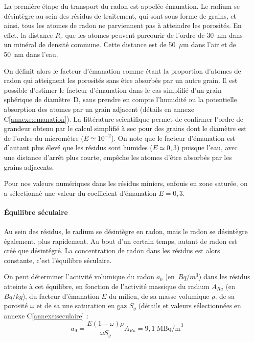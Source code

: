\documentclass{article}
\begin{document}
La première étape du transport du radon est appelée émanation. Le radium se désintègre au sein des résidus de traitement, qui sont sous forme de grains, et ainsi, tous les atomes de radon ne parviennent pas à atteindre les porosités. En effet, la distance $R_s$ que les atomes peuvent parcourir de l’ordre de 30~nm dans un minéral de densité commune. Cette distance est de 50~$\mu$m dans l’air et de 50~nm dans l’eau.

On définit alors le facteur d’émanation comme étant la proportion d’atomes de radon qui atteignent les porosités sans être absorbés par un autre grain. Il est possible d’estimer le facteur d’émanation \cite{fleischer_theory_1983} dans le cas simplifié d’un grain sphérique de diamètre~D, sans prendre en compte l’humidité ou la potentielle absorption des atomes par un grain adjacent (détails en annexe C\ref{annexe:emanation}). La littérature scientifique \cite{ferry_migration_2000} permet de confirmer l’ordre de grandeur obtenu par le calcul simplifié à sec pour des grains dont le diamètre est de l’ordre du micromètre ($E \simeq 10^{-2}$). On note que le facteur d’émanation est d’autant plus élevé que les résidus sont humides ($E\simeq 0,3$) puisque l’eau, avec une distance d’arrêt plus courte, empêche les atomes d’être absorbés par les grains adjacents.

Pour nos valeurs numériques dans les résidus miniers, enfouis en zone saturée, on a sélectionné une valeur du coefficient d’émanation $E=0,3$.

\paragraph{Équilibre séculaire}

\paragraph{} Au sein des résidus, le radium se désintègre en radon, mais le radon se désintègre également, plus rapidement. Au bout d’un certain temps, autant de radon est créé que désintégré. La concentration de radon dans les résidus est alors constante, c’est l’équilibre séculaire.

On peut déterminer l'activité volumique du radon $a_0$ (en~$Bq/m^3$) dans les résidus atteinte à cet équilibre, en fonction de l'activité massique du radium $A_{Ra}$ (en~$Bq/kg$), du facteur d'émanation $E$ du milieu, de sa masse volumique $\rho$, de sa porosité $\omega$ et de sa une saturation en gaz $S_g$ (détails et valeurs sélectionnées en annexe C\ref{annexe:seculaire} :
$$
a_0 =\frac{E(1-\omega)\rho}{\omega S_g} A_{Ra} =9,1 \; \text{MBq/m}^3
$$
\end{document}
